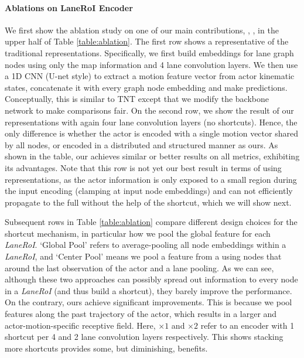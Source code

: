 \paragraph{Ablations on LaneRoI Encoder}
We first show the ablation study on one of our main contributions, \ie, \ROI, in the upper half of Table
\ref{table:ablation}. 
The first row shows a representative of the traditional representations. 
Specifically, we first build
embeddings for lane graph nodes using only the map information and 4 lane
convolution layers. We then use a
1D CNN (U-net style) to extract a motion feature vector from actor kinematic states, concatenate it
with every graph node embedding and make predictions. Conceptually, this is
similar to TNT \cite{tnt} except that we modify the backbone network to make comparisons fair. 
On the second row, we show the result of our \ROI
representations with again four lane convolution layers (no shortcuts). Hence, the only difference
is whether the actor is encoded with a single motion vector shared by
all nodes, or encoded in a distributed and structured manner as ours. As shown
in the table, our \ROI achieves similar or better results on all
metrics, exhibiting its advantages. Note that this row is not yet our best result
in terms of using \ROI representations, as the actor information is only exposed
to a small region during the input encoding (clamping at input
node embeddings) and can not efficiently propagate to
the full \ROI without the help of the shortcut, which we will show next.

Subsequent rows in Table \ref{table:ablation} compare different design
choices for the shortcut mechanism, in particular how we pool the global feature
for each \textit{LaneRoI}. `Global Pool' refers to average-pooling all node
embeddings within a \textit{LaneRoI}, and `Center Pool' means we pool a feature
from a \ROI using nodes that around the last observation of the actor and a lane
pooling. As we can see, although these two approaches can possibly
spread out information to every node in a \textit{LaneRoI} (and thus build a
shortcut), they barely improve the performance. On the contrary, ours achieve
significant improvements. This is because we pool features along the past
trajectory of the actor, which results in a larger and actor-motion-specific receptive field.
Here, $\times 1$ and $\times 2$ refer to an encoder with 1 shortcut per 4 and 2 lane
convolution layers respectively. This shows stacking more shortcuts
provides some, but diminishing, benefits.









